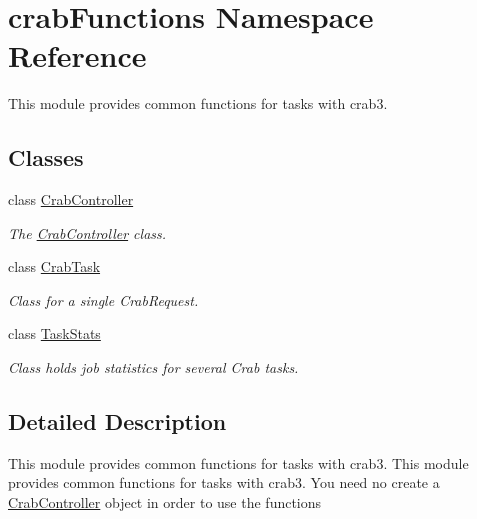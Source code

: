 \section{crab\-Functions Namespace Reference}
\label{namespacecrabFunctions}


This module provides common functions for tasks with crab3.  


\subsection*{Classes}
\begin{DoxyCompactItemize}
\item 
class \hyperlink{classcrabFunctions_1_1CrabController}{Crab\-Controller}
\begin{DoxyCompactList}\small\item\em The \hyperlink{classcrabFunctions_1_1CrabController}{Crab\-Controller} class. \end{DoxyCompactList}\item 
class \hyperlink{classcrabFunctions_1_1CrabTask}{Crab\-Task}
\begin{DoxyCompactList}\small\item\em Class for a single Crab\-Request. \end{DoxyCompactList}\item 
class \hyperlink{classcrabFunctions_1_1TaskStats}{Task\-Stats}
\begin{DoxyCompactList}\small\item\em Class holds job statistics for several Crab tasks. \end{DoxyCompactList}\end{DoxyCompactItemize}


\subsection{Detailed Description}
This module provides common functions for tasks with crab3. This module provides common functions for tasks with crab3. You need no create a \hyperlink{classcrabFunctions_1_1CrabController}{Crab\-Controller} object in order to use the functions 